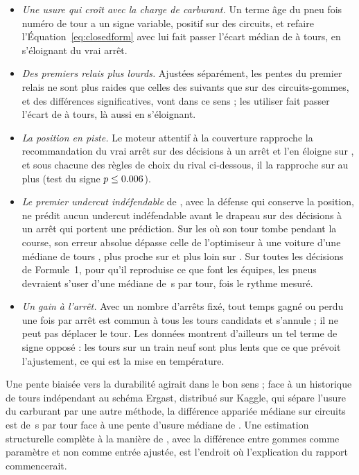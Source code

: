 \documentclass[11pt,a4paper]{article}
\begin{document}
\begin{itemize}
\item \emph{Une usure qui croît avec la charge de carburant.} Un terme âge du
pneu fois numéro de tour a un signe variable, positif sur \InterPositive{} des
\InterN{} circuits, et refaire l'Équation~\ref{eq:closedform} avec lui fait
passer l'écart médian de \InterGapWithout{} à \InterGapWith{} tours, en
s'éloignant du vrai arrêt.
\item \emph{Des premiers relais plus lourds.} Ajustées séparément, les pentes du
premier relais ne sont plus raides que celles des suivants que sur
\FirstSteeper{} des \FirstPairs{} circuits-gommes, et des \FirstSig{} différences
significatives, \FirstSigSteeper{} vont dans ce sens ; les utiliser fait passer
l'écart de \FirstGapPooled{} à \FirstGapSplit{} tours, là aussi en s'éloignant.
\item \emph{La position en piste.} Le moteur attentif à la couverture rapproche la
recommandation du vrai arrêt sur \RetestCloser{} des \NRetest{} décisions à un
arrêt et l'en éloigne sur \RetestFurther{}, et sous chacune des \NRetestRules{}
règles de choix du rival ci-dessous, il la rapproche sur au plus
\RetestCloserMax{} (test du signe $p \le 0.006{}$).
\item \emph{Le premier undercut indéfendable} de \citet{salminen2026}, avec la
défense qui conserve la position, ne prédit aucun undercut indéfendable avant le
drapeau sur \NRetestEuuAfterFlag{} des \NRetestPredicted{} décisions à un arrêt
qui portent une prédiction. Sur les \NRetestEuuInside{} où son tour tombe pendant
la course, son erreur absolue dépasse celle de l'optimiseur à une voiture d'une
médiane de \RetestEuuInsideAbsDiff{} tours \RetestEuuInsideAbsDiffCi{}, plus
proche sur \RetestEuuInsideCloser{} et plus loin sur \RetestEuuInsideFurther{}.
Sur toutes les décisions de Formule~1, pour qu'il reproduise ce que font les
équipes, les pneus devraient s'user d'une médiane de \DOneImpliedTheta{}\,s par
tour, \DOneThetaRatio{} fois le rythme mesuré.
\item \emph{Un gain à l'arrêt.} Avec un nombre d'arrêts fixé, tout temps gagné ou
perdu une fois par arrêt est commun à tous les tours candidats et s'annule ; il
ne peut pas déplacer le tour. Les données montrent d'ailleurs un tel terme de
signe opposé : les tours sur un train neuf sont plus lents que ce que prévoit
l'ajustement, ce qui est la mise en température.
\end{itemize}
Une pente biaisée vers la durabilité agirait dans le bon sens ; face à un
historique de tours indépendant au schéma Ergast, distribué sur Kaggle, qui sépare
l'usure du carburant par une autre méthode, la différence appariée médiane sur
\CrossSourceN{} circuits est de \CrossSourceDiff{}\,s par tour face à une pente
d'usure médiane de \CrossSourceWear{}. Une estimation structurelle complète à la
manière de \citet{rust1987}, avec la différence entre gommes comme paramètre et
non comme entrée ajustée, est l'endroit où l'explication du rapport commencerait.
\end{document}
